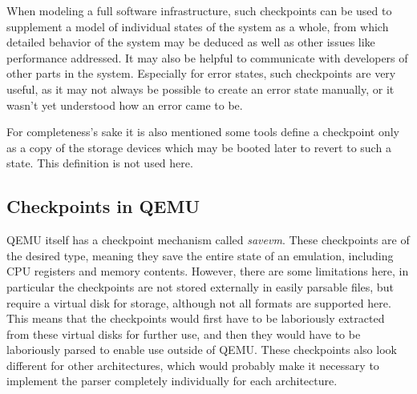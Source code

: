When modeling a full software infrastructure,
such checkpoints can be used to supplement a model of individual states of the system as a whole,
from which detailed behavior of the system may be deduced
as well as other issues like performance addressed.
It may also be helpful to communicate with developers of other parts in the system.
Especially for error states, such checkpoints are very useful,
as it may not always be possible to create an error state manually,
or it wasn't yet understood how an error came to be.

For completeness's sake it is also mentioned some tools define a checkpoint only as a copy of the storage devices
which may be booted later to revert to such a state.
This definition is not used here.

\subsection{Checkpoints in QEMU}
QEMU itself has a checkpoint mechanism called \emph{savevm}.
These checkpoints are of the desired type, meaning they save the entire state of an emulation,
including CPU registers and memory contents.
However, there are some limitations here, in particular the checkpoints are not stored externally in easily parsable files,
but require a virtual disk for storage, although not all formats are supported here.
This means that the checkpoints would first have to be laboriously extracted from these virtual disks for further use,
and then they would have to be laboriously parsed to enable use outside of QEMU.
These checkpoints also look different for other architectures, which would probably make it necessary
to implement the parser completely individually for each architecture.